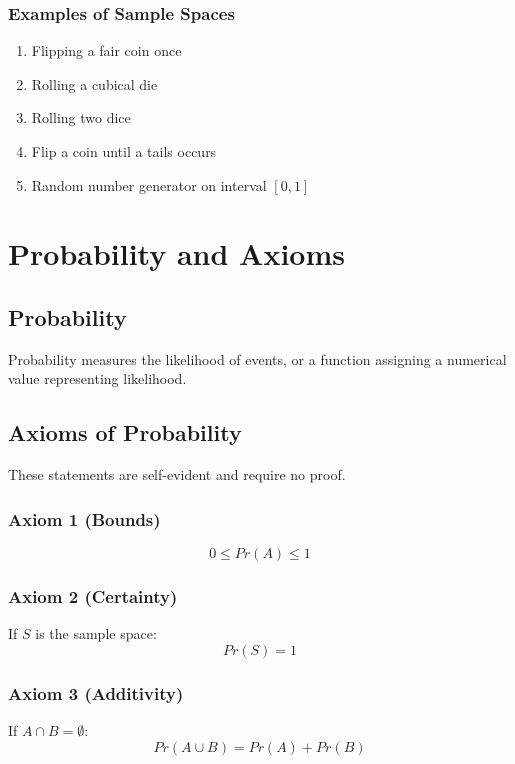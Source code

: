 \documentclass[12pt]{article}
\begin{document}
\subsubsection*{Examples of Sample Spaces}

\begin{enumerate}
\item Flipping a fair coin once
\item Rolling a cubical die
\item Rolling two dice
\item Flip a coin until a tails occurs
\item Random number generator on interval $[0,1]$
\end{enumerate}

\section{Probability and Axioms}

\subsection{Probability}

Probability measures the likelihood of events, or a function assigning a numerical value representing likelihood.

\subsection{Axioms of Probability}

These statements are self-evident and require no proof.

\subsubsection*{Axiom 1 (Bounds)}

\[
0 \le Pr(A) \le 1
\]

\subsubsection*{Axiom 2 (Certainty)}

If $S$ is the sample space:
\[
Pr(S) = 1
\]

\subsubsection*{Axiom 3 (Additivity)}

If $A \cap B = \emptyset$:
\[
Pr(A \cup B) = Pr(A) + Pr(B)
\]
\end{document}
